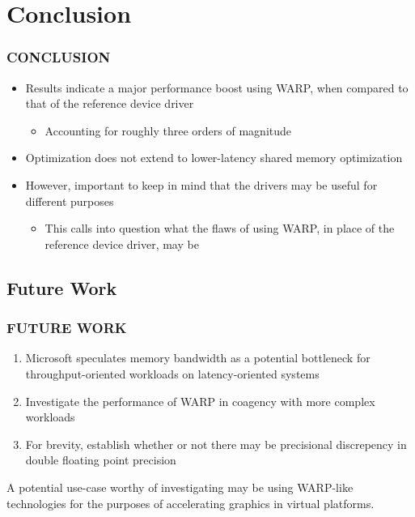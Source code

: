 
\section{Conclusion}
\begin{frame}
\frametitle{CONCLUSION}

\begin{itemize}
\item Results indicate a major performance boost using WARP, when compared to that of the reference device driver
  \begin{itemize}
  \item Accounting for roughly three orders of magnitude
  \end{itemize}
\item Optimization does not extend to lower-latency shared memory optimization
\item However, important to keep in mind that the drivers may be useful for different purposes
  \begin{itemize}
  \item This calls into question what the flaws of using WARP, in place of the reference device driver, may be
  \end{itemize}
\end{itemize}

\end{frame}

\subsection{Future Work}
\begin{frame}
\frametitle{FUTURE WORK}

\begin{enumerate}
\item Microsoft speculates memory bandwidth as a potential bottleneck for throughput-oriented workloads on latency-oriented systems
\item Investigate the performance of WARP in coagency with more complex workloads
\item For brevity, establish whether or not there may be precisional discrepency in double floating point precision
\end{enumerate}

A potential use-case worthy of investigating may be using WARP-like technologies for the purposes of accelerating graphics in virtual platforms.

\end{frame}
